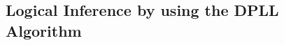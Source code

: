 %











\subsection{Logical Inference by using the DPLL Algorithm}
\label{subsec:Inference_DPLL}

